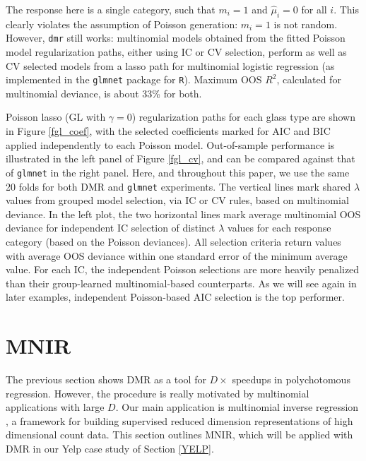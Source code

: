 \documentclass[12pt]{article}
\newcommand{\cd}[1]{{\tt#1}}
\begin{document}
The response here is a single category, such that $m_i = 1$ and $\hat\mu_i=0$
for all $i$.  This clearly violates the assumption of Poisson generation:
$m_i=1$ is not random.  However, \cd{dmr} still works:  multinomial models
obtained from the fitted Poisson model regularization paths, either using IC
or CV selection, perform as well as CV selected models from a lasso path for
multinomial logistic regression (as implemented in the \cd{glmnet} package for
\cd{R}).  Maximum OOS $R^2$, calculated for multinomial deviance, is about
33\% for both.

Poisson lasso (GL with $\gamma=0$) regularization paths for each glass type
are shown in Figure \ref{fgl_coef}, with the selected coefficients marked for
AIC and BIC applied independently to each Poisson model.  Out-of-sample
performance is illustrated in the left panel of Figure \ref{fgl_cv}, and can
be compared against that of \cd{glmnet} in the right panel.  Here, and
throughout this paper, we use the same 20 folds for both DMR and \cd{glmnet}
experiments.  The vertical lines mark shared $\lambda$ values from grouped
model selection, via IC or CV rules, based on multinomial deviance.  In the
left plot, the two horizontal lines mark average multinomial OOS deviance for
independent IC selection of distinct $\lambda$ values for each response
category (based on the Poisson deviances).  All selection criteria return
values with average OOS deviance within one standard error of the minimum
average value.  For each IC, the independent Poisson selections are more
heavily penalized than their group-learned multinomial-based counterparts.  As
we will see again in later examples, independent Poisson-based AIC selection
is the top performer.

\section{MNIR}
\label{MNIR}

The previous section shows DMR as a tool for $D\times$ speedups in
polychotomous regression.  However, the procedure is really motivated by
multinomial applications with large $D$.  Our main application is multinomial
inverse regression \citep[MNIR][]{taddy_multinomial_2013}, a framework for
building supervised reduced dimension representations of high dimensional
count data.  This section outlines MNIR, which will be applied with DMR in our
Yelp case study of Section \ref{YELP}.
\end{document}
